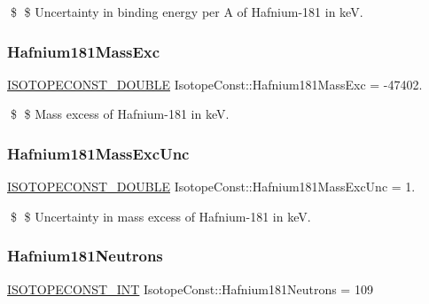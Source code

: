 \$ \$ Uncertainty in binding energy per A of Hafnium-\/181 in keV. \mbox{\label{group___isotope_const-_hafnium-_hf181_ga0c7e28c31861b96e704f961533fb4f74}} 
\subsubsection{\texorpdfstring{Hafnium181\+Mass\+Exc}{Hafnium181MassExc}}
{\footnotesize\ttfamily \mbox{\hyperlink{group___isotope_const-_macros_ga8f45a7272ce02c0b4c65c44636ed719a}{I\+S\+O\+T\+O\+P\+E\+C\+O\+N\+S\+T\+\_\+\+D\+O\+U\+B\+LE}} Isotope\+Const\+::\+Hafnium181\+Mass\+Exc = -\/47402.}

\$ \$ Mass excess of Hafnium-\/181 in keV. \mbox{\label{group___isotope_const-_hafnium-_hf181_ga42a0c51a8866f9e462ff73039dbf3109}} 
\subsubsection{\texorpdfstring{Hafnium181\+Mass\+Exc\+Unc}{Hafnium181MassExcUnc}}
{\footnotesize\ttfamily \mbox{\hyperlink{group___isotope_const-_macros_ga8f45a7272ce02c0b4c65c44636ed719a}{I\+S\+O\+T\+O\+P\+E\+C\+O\+N\+S\+T\+\_\+\+D\+O\+U\+B\+LE}} Isotope\+Const\+::\+Hafnium181\+Mass\+Exc\+Unc = 1.}

\$ \$ Uncertainty in mass excess of Hafnium-\/181 in keV. \mbox{\label{group___isotope_const-_hafnium-_hf181_ga5e367c54db52d15ab6bab3bdb1ba2da6}} 
\subsubsection{\texorpdfstring{Hafnium181\+Neutrons}{Hafnium181Neutrons}}
{\footnotesize\ttfamily \mbox{\hyperlink{group___isotope_const-_macros_ga5f18360b3e99483a35c32d789e62621c}{I\+S\+O\+T\+O\+P\+E\+C\+O\+N\+S\+T\+\_\+\+I\+NT}} Isotope\+Const\+::\+Hafnium181\+Neutrons = 109}

